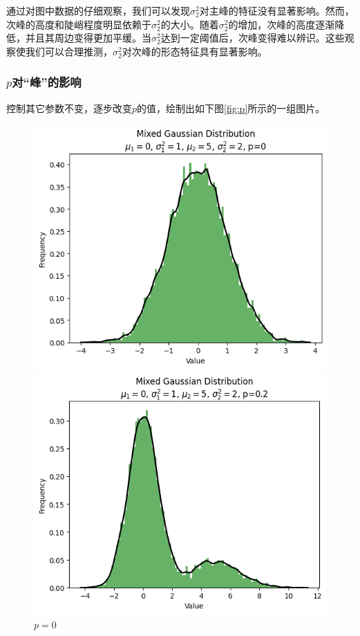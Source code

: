\documentclass{article}
\begin{document}
通过对图中数据的仔细观察，我们可以发现$\sigma_2^2$对主峰的特征没有显著影响。然而，次峰的高度和陡峭程度明显依赖于$\sigma_2^2$的大小。随着$\sigma_2^2$的增加，次峰的高度逐渐降低，并且其周边变得更加平缓。当$\sigma_2^2$达到一定阈值后，次峰变得难以辨识。这些观察使我们可以合理推测，$\sigma_2^2$对次峰的形态特征具有显著影响。\label{sec:peak_influence}

\subsubsection{\texorpdfstring{$p$对“峰”的影响}{p对“峰”的影响}}

控制其它参数不变，逐步改变$p$的值，绘制出如下图\ref{fig:p}所示的一组图片。

\begin{figure}[H]
    \centering
    \begin{minipage}[b]{0.3\linewidth}
        \centering
        \includegraphics[width=\linewidth]{figure/p=0.png}
        \caption{$p=0$}
    \end{minipage}
    \hfill
    \begin{minipage}[b]{0.3\linewidth}
        \centering
        \includegraphics[width=\linewidth]{figure/p=0.2.png}

\end{minipage}
\end{figure}
\end{document}
